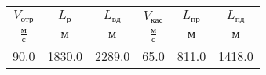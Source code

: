 \begin{tabular}{|c|c|c|c|c|c|}
\hline
$V_{отр}$ & $L_{р}$ & $L_{вд}$ & $V_{кас}$ & $L_{пр}$ & $L_{пд}$ \\ 
\hline
$\frac{м}{с}$ & $м$ & $м$ & $\frac{м}{с}$ & $м$ & $м$ \\ 
\hline
90.0 & 1830.0 & 2289.0 & 65.0 & 811.0 & 1418.0 \\ 
\hline
\end{tabular}